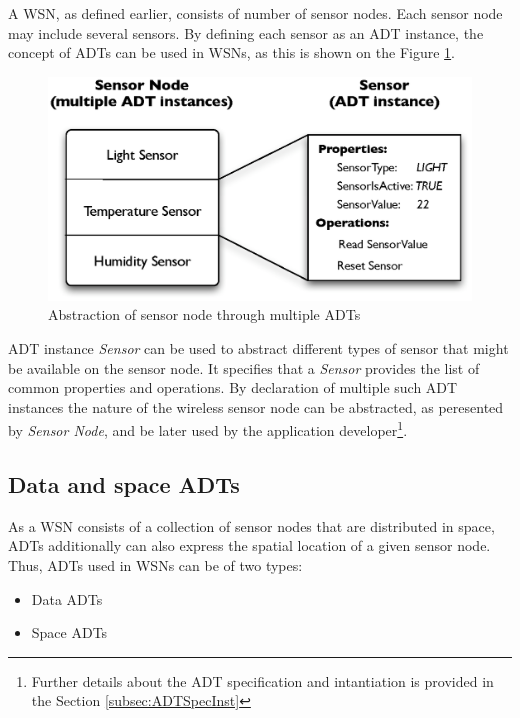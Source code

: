 A WSN, as defined earlier, consists of number of sensor nodes. Each sensor node
may include several sensors. By defining each sensor as
an ADT instance, the concept of ADTs can be used in WSNs, as this is shown on
the Figure \ref{Fig:MultipleADTs}.

\begin{figure}
\centering
\includegraphics[scale=0.71]{img/ADTsMultipleInstances.eps}
\caption[Abstraction of sensor node through multiple ADTs]{Abstraction of sensor node through multiple ADTs}
\label{Fig:MultipleADTs}
\end{figure} 
  
ADT instance \emph{Sensor} can be used to abstract different types of sensor
that might be available on the sensor node. It specifies that a \emph{Sensor}
provides the list of common properties and operations. 
By declaration of multiple such ADT instances the nature of the
wireless sensor node can be abstracted, as peresented by \emph{Sensor Node}, and
be later used by the application developer\footnote{Further details about the ADT specification and intantiation
is provided in the Section \ref{subsec:ADTSpecInst}}.

\subsection{Data and space ADTs} \label{subsubsec:DataAndSpaceADTs}

As a WSN consists of a collection of sensor nodes that are distributed in space,
ADTs additionally can also express the spatial location of a given sensor node.
Thus, ADTs used in WSNs can be of two types:

\begin{itemize}
  \item Data ADTs
  \item Space ADTs 
\end{itemize}

